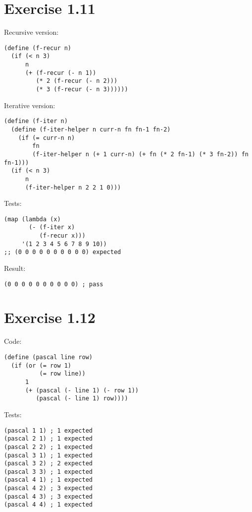 \documentclass[../main.tex]{subfiles}
\begin{document}
\section{Exercise 1.11}

Recursive version:

\begin{lstlisting}
(define (f-recur n)
  (if (< n 3)
      n
      (+ (f-recur (- n 1))
         (* 2 (f-recur (- n 2)))
         (* 3 (f-recur (- n 3))))))
\end{lstlisting}

Iterative version:

\begin{lstlisting}
(define (f-iter n)
  (define (f-iter-helper n curr-n fn fn-1 fn-2)
    (if (= curr-n n)
        fn
        (f-iter-helper n (+ 1 curr-n) (+ fn (* 2 fn-1) (* 3 fn-2)) fn fn-1)))
  (if (< n 3)
      n
      (f-iter-helper n 2 2 1 0)))
\end{lstlisting}

Tests:

\begin{lstlisting}
(map (lambda (x)
       (- (f-iter x)
          (f-recur x)))
     '(1 2 3 4 5 6 7 8 9 10))
;; (0 0 0 0 0 0 0 0 0 0) expected
\end{lstlisting}

Result:

\begin{lstlisting}
(0 0 0 0 0 0 0 0 0 0) ; pass
\end{lstlisting}

\section{Exercise 1.12}

Code:

\begin{lstlisting}
(define (pascal line row)
  (if (or (= row 1)
          (= row line))
      1
      (+ (pascal (- line 1) (- row 1))
         (pascal (- line 1) row))))
\end{lstlisting}

Tests:

\begin{lstlisting}
(pascal 1 1) ; 1 expected
(pascal 2 1) ; 1 expected
(pascal 2 2) ; 1 expected
(pascal 3 1) ; 1 expected
(pascal 3 2) ; 2 expected
(pascal 3 3) ; 1 expected
(pascal 4 1) ; 1 expected
(pascal 4 2) ; 3 expected
(pascal 4 3) ; 3 expected
(pascal 4 4) ; 1 expected
\end{lstlisting}
\end{document}
